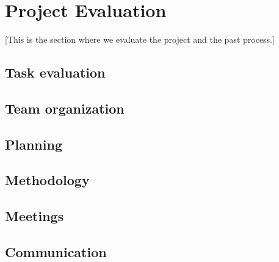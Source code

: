 \section{Project Evaluation}\label{Project Evaluation}
    [This is the section where we evaluate the project and the past process.]
    
    \subsection{Task evaluation}
    
    \subsection{Team organization }
    \subsection{Planning}
    \subsection{Methodology}
    \subsection{Meetings}
    \subsection{Communication}
    
